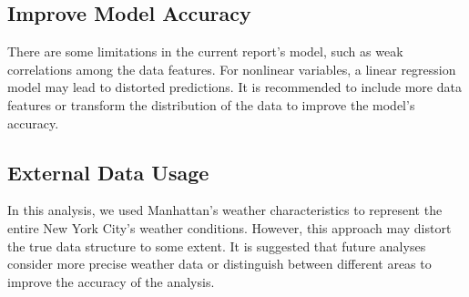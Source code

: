 \documentclass[11pt]{article}
\begin{document}
\subsection{Improve Model Accuracy}
There are some limitations in the current report's model, such as weak correlations among the data features. For nonlinear variables, a linear regression model may lead to distorted predictions. It is recommended to include more data features or transform the distribution of the data to improve the model's accuracy.

\subsection{External Data Usage}
In this analysis, we used Manhattan’s weather characteristics to represent the entire New York City's weather conditions. However, this approach may distort the true data structure to some extent. It is suggested that future analyses consider more precise weather data or distinguish between different areas to improve the accuracy of the analysis.



\clearpage 
\printbibliography
\end{document}
